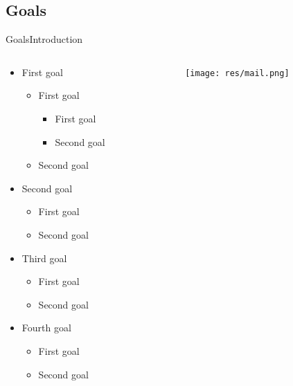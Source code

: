 \subsection*{Goals}
\begin{frame}{Goals}{Introduction}%
	\begin{columns}
		\begin{column}{0.5\textwidth}
					\begin{itemize}
				\item First goal
					\begin{itemize}
						\item First goal
						\begin{itemize}
							\item First goal
							\item Second goal
						\end{itemize}
						\item Second goal
					\end{itemize}
				\item Second goal
					\begin{itemize}
						\item First goal
						\item Second goal
					\end{itemize}
				\item Third goal
					\begin{itemize}
						\item First goal
						\item Second goal
					\end{itemize}
				\item Fourth goal
					\begin{itemize}
						\item First goal
						\item Second goal
					\end{itemize}
				\end{itemize}
							\end{column}
					\begin{column}{0.5\textwidth}
				\begin{center}
									\begin{figure}
						\texttt{[image: res/mail.png]}
						\caption{\label{fig:}}
					\end{figure}
									\end{center}
			\end{column}
				\end{columns}
		\end{frame}



